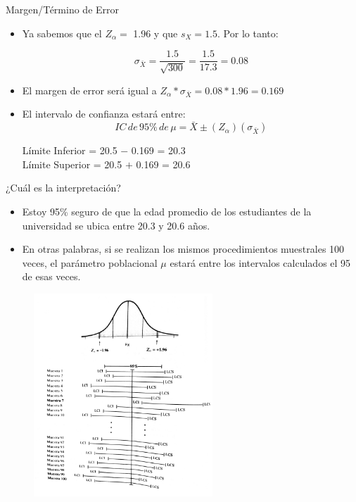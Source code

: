 \documentclass{beamer}
\begin{document}
\begin{frame}{Margen/Término de Error}
\begin{itemize}
\justifying
\item Ya sabemos que el $Z_{\alpha}=$ 1.96 y que $s_X=1.5$. Por lo tanto:

$$\sigma_{\bar{X}}=\dfrac{1.5}{\sqrt{300}}=\dfrac{1.5}{17.3}=0.08$$
\item El margen de error será igual a $Z_{\alpha}*\sigma_{\bar{X}}=0.08*1.96=0.169$
\item El intervalo de confianza estará entre:
$$IC\, de\, 95\%\, de\, \mu=\bar{X}\pm (Z_{\alpha})(\sigma_{\bar{X}})$$
\begin{center}
Límite Inferior = 20.5 $-$ 0.169 = 20.3 \\
Límite Superior = 20.5 $+$ 0.169 = 20.6  
\end{center}
\end{itemize}
\end{frame}

\begin{frame}{¿Cuál es la interpretación?}
\begin{itemize}
\justifying
\item Estoy 95\% seguro de que la edad promedio de los estudiantes de la universidad se ubica entre 20.3 y 20.6 años.
\item En otras palabras, si se realizan los mismos procedimientos muestrales 100 veces, el parámetro poblacional $\mu$ estará entre los intervalos calculados el 95 de esas veces.
\end{itemize}

\end{frame}

\begin{frame}
					\begin{figure}[H]
						\centering  
						\caption{} 
						\includegraphics[width = 0.6\textwidth]{./cap7}
					\end{figure}
\end{frame}
\end{document}

